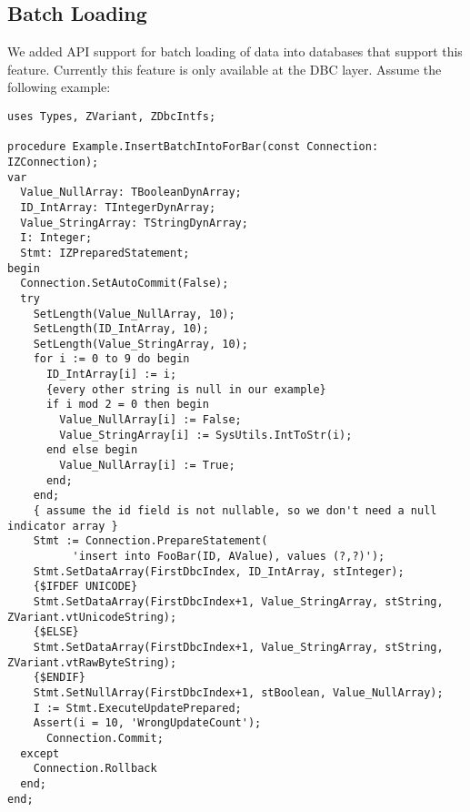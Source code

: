 \documentclass[a4paper,12pt,oneside]{book}
\begin{document}
\subsection{Batch Loading}
\label{sec:Rev4_GeneralChanges_BatchLoading}
We added API support for batch loading of data into databases that support this feature.
Currently this feature is only available at the DBC layer.
Assume the following example:

\begin{lstlisting}
uses Types, ZVariant, ZDbcIntfs;

procedure Example.InsertBatchIntoForBar(const Connection: IZConnection);
var
  Value_NullArray: TBooleanDynArray;
  ID_IntArray: TIntegerDynArray;
  Value_StringArray: TStringDynArray;
  I: Integer;
  Stmt: IZPreparedStatement;
begin
  Connection.SetAutoCommit(False);
  try
    SetLength(Value_NullArray, 10);
    SetLength(ID_IntArray, 10);
    SetLength(Value_StringArray, 10);
    for i := 0 to 9 do begin
      ID_IntArray[i] := i;
      {every other string is null in our example}
      if i mod 2 = 0 then begin
        Value_NullArray[i] := False;
        Value_StringArray[i] := SysUtils.IntToStr(i);
      end else begin
        Value_NullArray[i] := True;
      end;
    end;
    { assume the id field is not nullable, so we don't need a null indicator array }
    Stmt := Connection.PrepareStatement(
		  'insert into FooBar(ID, AValue), values (?,?)');
    Stmt.SetDataArray(FirstDbcIndex, ID_IntArray, stInteger);
    {$IFDEF UNICODE}
    Stmt.SetDataArray(FirstDbcIndex+1, Value_StringArray, stString, ZVariant.vtUnicodeString);
    {$ELSE}
    Stmt.SetDataArray(FirstDbcIndex+1, Value_StringArray, stString, ZVariant.vtRawByteString);
    {$ENDIF}
    Stmt.SetNullArray(FirstDbcIndex+1, stBoolean, Value_NullArray);
    I := Stmt.ExecuteUpdatePrepared;
    Assert(i = 10, 'WrongUpdateCount');
	  Connection.Commit;
  except
    Connection.Rollback
  end;
end;
\end{lstlisting}
\end{document}
